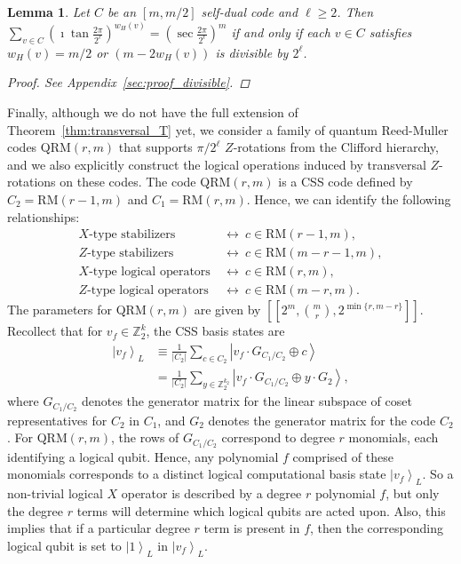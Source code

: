 \documentclass[twoside,romanappendices]{IEEEtran}
\newtheorem{lemma}[theorem]{Lemma}
\newcommand{\ket}[1]{\left\lvert #1 \right\rangle}
\newcommand{\llbr}{[\![}
\newcommand{\rrbr}{]\!]}
\begin{document}
\begin{lemma}
\label{lem:divisible}
Let $C$ be an $[m,m/2]$ self-dual code and $\ell \geq 2$.
Then $\sum_{v \in C} \left( \imath \tan\frac{2\pi}{2^{\ell}} \right)^{w_H(v)} = \left( \sec\frac{2\pi}{2^{\ell}} \right)^{m}$ if and only if each $v \in C$ satisfies $w_H(v) = m/2$ or $(m - 2 w_H(v))$ is divisible by $2^{\ell}$.
\begin{proof}
See Appendix~\ref{sec:proof_divisible}.
\end{proof}
\end{lemma}


Finally, although we do not have the full extension of Theorem~\ref{thm:transversal_T} yet, we consider a family of quantum Reed-Muller codes QRM$(r,m)$ that supports $\pi/2^{\ell}$ $Z$-rotations from the Clifford hierarchy, and we also explicitly construct the logical operations induced by transversal $Z$-rotations on these codes.
The code QRM$(r,m)$ is a CSS code defined by $C_2 = \text{RM}(r-1,m)$ and $C_1 = \text{RM}(r,m)$.
Hence, we can identify the following relationships:
\begin{align}
\text{$X$-type\ stabilizers}\ & \leftrightarrow\ c \in \text{RM}(r-1,m), \nonumber \\
%
\text{$Z$-type\ stabilizers}\ & \leftrightarrow\ c \in \text{RM}(m-r-1,m), \nonumber \\
%
\text{$X$-type\ logical\ operators}\ & \leftrightarrow\ c \in \text{RM}(r,m), \nonumber \\
%
\text{$Z$-type\ logical\ operators}\ & \leftrightarrow\ c \in \text{RM}(m-r,m).
\end{align}
The parameters for QRM$(r,m)$ are given by $\llbr 2^m, \binom{m}{r}, 2^{\min\{r,m-r\}} \rrbr$.
Recollect that for $v_f \in \mathbb{Z}_2^k$, the CSS basis states are
\begin{align}
\label{eq:css_basis_states}
\ket{v_f}_L & \equiv \frac{1}{|C_2|} \sum_{c \in C_2}  \ket{v_f \cdot G_{C_1/C_2} \oplus c} \nonumber \\
%
  & = \frac{1}{|C_2|} \sum_{y \in \mathbb{Z}_2^{k_2}}  \ket{v_f \cdot G_{C_1/C_2} \oplus y \cdot G_2},
\end{align}
where $G_{C_1/C_2}$ denotes the generator matrix for the linear subspace of coset representatives for $C_2$ in $C_1$, and $G_2$ denotes the generator matrix for the code $C_2$.
For QRM$(r,m)$, the rows of $G_{C_1/C_2}$ correspond to degree $r$ monomials, each identifying a logical qubit.
Hence, any polynomial $f$ comprised of these monomials corresponds to a distinct logical computational basis state $\ket{v_f}_L$.
So a non-trivial logical $X$ operator is described by a degree $r$ polynomial $f$, but only the degree $r$ terms will determine which logical qubits are acted upon.
Also, this implies that if a particular degree $r$ term is present in $f$, then the corresponding logical qubit is set to $\ket{1}_L$ in $\ket{v_f}_L$.
\end{document}
